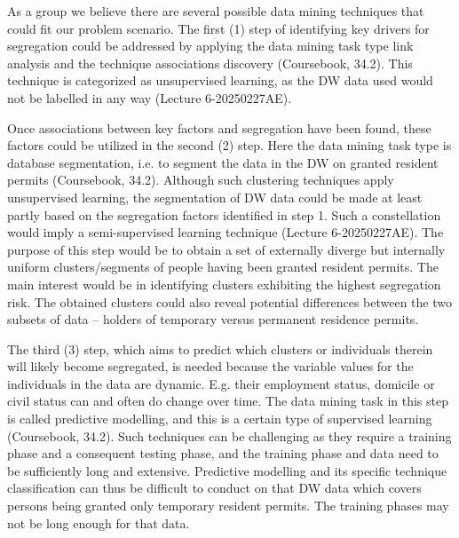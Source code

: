 As a group we believe there are several possible data mining techniques that could fit our problem scenario. 
The first (1) step of identifying key drivers for segregation could be addressed by applying the data mining task type link analysis and 
the technique associations discovery (Coursebook, 34.2). 
This technique is categorized as unsupervised learning,
as the DW data used would not be labelled in any way (Lecture 6-20250227AE).  

Once associations between key factors and segregation have been found, 
these factors could be utilized in the second (2) step. 
Here the data mining task type is database segmentation, 
i.e. to segment the data in the DW on granted resident permits (Coursebook, 34.2). 
Although such clustering techniques apply unsupervised learning, 
the segmentation of DW data could be made at least partly based on the segregation factors identified in step 1. 
Such a constellation would imply a semi-supervised learning technique (Lecture 6-20250227AE). 
The purpose of this step would be to obtain a set of externally diverge but 
internally uniform clusters/segments of people having been granted resident permits. 
The main interest would be in identifying clusters exhibiting the highest segregation risk. 
The obtained clusters could also reveal potential differences between the two subsets of data – 
holders of temporary versus permanent residence permits.  

The third (3) step, which aims to predict which clusters or individuals therein will likely become segregated, 
is needed because the variable values for the individuals in the data are dynamic. 
E.g. their employment status, domicile or civil status can and often do change over time. 
The data mining task in this step is called predictive modelling, and this is a certain type of supervised learning (Coursebook, 34.2). 
Such techniques can be challenging as they require a training phase and a consequent testing phase, 
and the training phase and data need to be sufficiently long and extensive. 
Predictive modelling and its specific technique classification can thus be difficult to conduct on that DW data which 
covers persons being granted only temporary resident permits. The training phases may not be long enough for that data.    